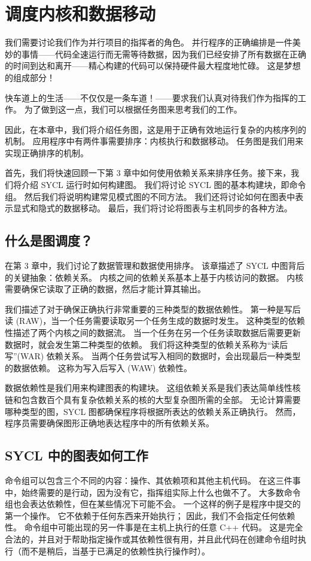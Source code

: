 \section{调度内核和数据移动}
我们需要讨论我们作为并行项目的指挥者的角色。 并行程序的正确编排是一件美妙的事情——代码全速运行而无需等待数据，因为我们已经安排了所有数据在正确的时间到达和离开——精心构建的代码可以保持硬件最大程度地忙碌。 这是梦想的组成部分！

快车道上的生活——不仅仅是一条车道！——要求我们认真对待我们作为指挥的工作。 为了做到这一点，我们可以根据任务图来思考我们的工作。

因此，在本章中，我们将介绍任务图，这是用于正确有效地运行复杂的内核序列的机制。 应用程序中有两件事需要排序：内核执行和数据移动。 任务图是我们用来实现正确排序的机制。

首先，我们将快速回顾一下第 3 章中如何使用依赖关系来排序任务。接下来，我们将介绍 SYCL 运行时如何构建图。 我们将讨论 SYCL 图的基本构建块，即命令组。 然后我们将说明构建常见模式图的不同方法。 我们还将讨论如何在图表中表示显式和隐式的数据移动。 最后，我们将讨论将图表与主机同步的各种方法。


\subsection{什么是图调度？}
在第 3 章中，我们讨论了数据管理和数据使用排序。 该章描述了 SYCL 中图背后的关键抽象：依赖关系。 内核之间的依赖关系基本上基于内核访问的数据。 内核需要确保它读取了正确的数据，然后才能计算其输出。

我们描述了对于确保正确执行非常重要的三种类型的数据依赖性。 第一种是写后读 (RAW)，当一个任务需要读取另一个任务生成的数据时发生。 这种类型的依赖性描述了两个内核之间的数据流。 当一个任务在另一个任务读取数据后需要更新数据时，就会发生第二种类型的依赖。 我们将这种类型的依赖关系称为“读后写”(WAR) 依赖关系。 当两个任务尝试写入相同的数据时，会出现最后一种类型的数据依赖。 这称为写入后写入 (WAW) 依赖性。

数据依赖性是我们用来构建图表的构建块。 这组依赖关系是我们表达简单线性核链和包含数百个具有复杂依赖关系的核的大型复杂图所需的全部。 无论计算需要哪种类型的图，SYCL 图都确保程序将根据所表达的依赖关系正确执行。 然而，程序员需要确保图形正确地表达程序中的所有依赖关系。

\subsection{SYCL 中的图表如何工作}
命令组可以包含三个不同的内容：操作、其依赖项和其他主机代码。 在这三件事中，始终需要的是行动，因为没有它，指挥组实际上什么也做不了。 大多数命令组也会表达依赖性，但在某些情况下可能不会。 一个这样的例子是程序中提交的第一个操作。 它不依赖于任何东西来开始执行； 因此，我们不会指定任何依赖性。 命令组中可能出现的另一件事是在主机上执行的任意 C++ 代码。 这是完全合法的，并且对于帮助指定操作或其依赖性很有用，并且此代码在创建命令组时执行（而不是稍后，当基于已满足的依赖性执行操作时）。

